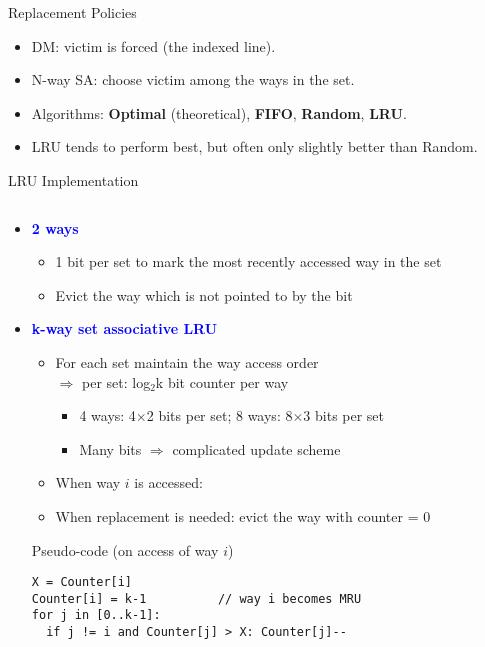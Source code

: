 \documentclass[aspectratio=169,12pt]{beamer}
\begin{document}
\begin{frame}{Replacement Policies}
\begin{itemize}
  \item DM: victim is forced (the indexed line).
  \item N-way SA: choose victim among the ways in the set.
  \item Algorithms: \textbf{Optimal} (theoretical), \textbf{FIFO}, \textbf{Random}, \textbf{LRU}.
  \item LRU tends to perform best, but often only slightly better than Random.
\end{itemize}
\end{frame}

\begin{frame}[fragile]{LRU Implementation}
\begin{columns}[T]
\begin{column}{0.70\textwidth}
\begin{itemize}
  \item \textcolor{blue}{\textbf{2 ways}}
  \begin{itemize}
    \item 1 bit per set to mark the most recently accessed way in the set
    \item Evict the way which is not pointed to by the bit
  \end{itemize}
  
  \item \textcolor{blue}{\textbf{k-way set associative LRU}}
  \begin{itemize}
    \item For each set maintain the way access order \\
    $\Rightarrow$ per set: log$_2$k bit counter per way
    \begin{itemize}
      \item 4 ways: 4$\times$2 bits per set; 8 ways: 8$\times$3 bits per set
      \item Many bits $\Rightarrow$ complicated update scheme
    \end{itemize}
    \item When way $i$ is accessed:
    \item When replacement is needed: evict the way with counter = 0
  \end{itemize}
  
  \begin{block}{Pseudo-code (on access of way $i$)}
  \begin{lstlisting}[basicstyle=\ttfamily\small]
X = Counter[i]
Counter[i] = k-1          // way i becomes MRU
for j in [0..k-1]:
  if j != i and Counter[j] > X: Counter[j]--
  \end{lstlisting}
  \end{block}
\end{itemize}
\end{column}


\end{columns}
\end{frame}
\end{document}
